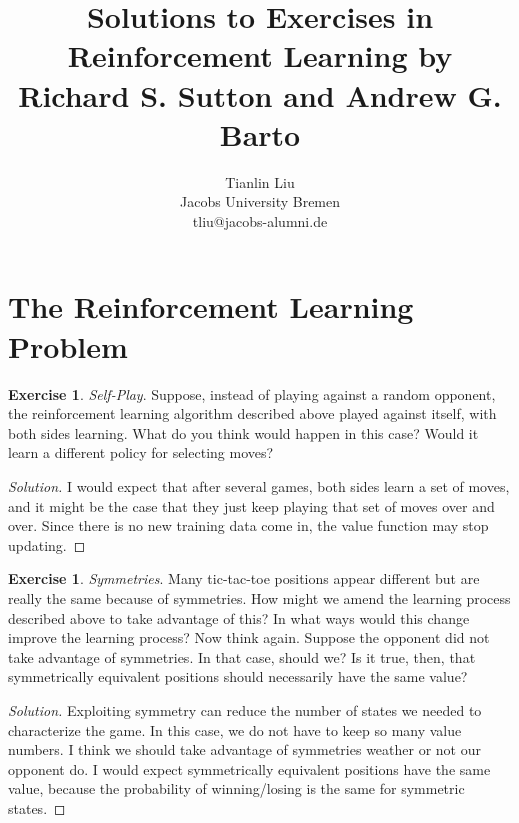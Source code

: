 \documentclass[oneside,11pt]{article}
\theoremstyle{definition}
\newtheorem{exer}[thm]{Exercise}
\newenvironment{solution}
{\renewcommand\qedsymbol{$\blacksquare$}\begin{proof}[Solution]} {\end{proof}}
\begin{document}
\title{Solutions to Exercises in Reinforcement Learning by Richard S. Sutton and Andrew G. Barto}
\vspace{2mm}


\author{ Tianlin Liu\\
Jacobs University Bremen\\
tliu@jacobs-alumni.de
}


\date{}

\maketitle

\tableofcontents

\section{The Reinforcement Learning Problem}

\begin{exer}
\emph{Self-Play}. Suppose, instead of playing against a random opponent, the reinforcement learning algorithm described above played against itself, with both sides learning. What do you think would happen in this case? Would it learn a different policy for selecting moves?
\end{exer}

\begin{shaded}
\begin{solution} 
 I would expect that after several games, both sides learn a set of moves, and it might be the case that they just keep playing that set of moves over and over. Since there is no new training data come in, the value function may stop updating.
 
 
\end{solution}
\end{shaded}

\begin{exer}
\emph{Symmetries}. Many tic-tac-toe positions appear different but are really the same because of symmetries. How might we amend the learning process described above to take advantage of this? In what ways would this change improve the learning process? Now think again. Suppose the opponent did not take advantage of symmetries. In that case, should we? Is it true, then, that symmetrically equivalent positions should necessarily have the same value?
\end{exer}

\begin{shaded}
\begin{solution} 

Exploiting symmetry can reduce the number of states we needed to characterize the game. In this case, we do not have to keep so many value numbers. I think we should take advantage of symmetries weather or not our opponent do. I would expect symmetrically equivalent positions have the same value, because the probability of winning/losing is the same for  symmetric states.




\end{solution}
\end{shaded}
\end{document}
